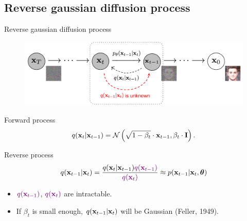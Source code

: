 \subsection{Reverse gaussian diffusion process}
\begin{frame}{Reverse gaussian diffusion process}
	\begin{figure}
		\includegraphics[width=0.8\linewidth]{figs/DDPM}
	\end{figure}
	\vspace{-0.5cm}
	\begin{block}{Forward process}
		\vspace{-0.3cm}
		\[
			q(\mathbf{x}_t | \mathbf{x}_{t-1}) = \mathcal{N}\left(\sqrt{1 - \beta_t} \cdot \mathbf{x}_{t-1}, \beta_t \cdot \mathbf{I}\right).
		\]
		\vspace{-0.5cm}
	\end{block}
	\begin{block}{Reverse process}
		\vspace{-0.3cm}
		\[
			q(\mathbf{x}_{t-1}|\mathbf{x}_{t}) = \frac{q(\mathbf{x}_{t}|\mathbf{x}_{t-1}) {\color{violet}q(\mathbf{x}_{t-1})}}{{\color{violet}q(\mathbf{x}_{t})}} \approx p(\mathbf{x}_{t - 1} | \mathbf{x}_t, \boldsymbol{\theta})
		\]
		\vspace{-0.3cm}
		\begin{itemize}
			\item ${\color{violet}q(\mathbf{x}_{t-1})}$, ${\color{violet}q(\mathbf{x}_{t})}$ are intractable.
			\item If $\beta_t$ is small enough, $q(\mathbf{x}_{t-1}|\mathbf{x}_{t})$ will be Gaussian (Feller, 1949).
		\end{itemize}
	\end{block}
	\end{frame}
